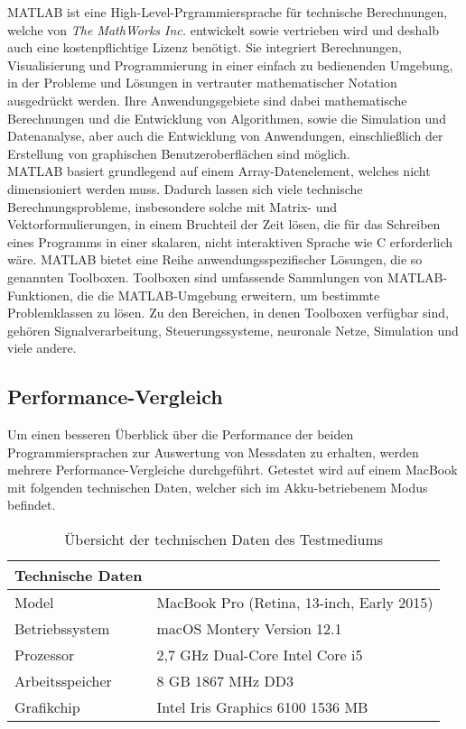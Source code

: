 MATLAB ist eine High-Level-Prgrammiersprache für technische Berechnungen, welche von \textit{The MathWorks Inc.} entwickelt sowie vertrieben wird und deshalb auch eine kostenpflichtige Lizenz benötigt. Sie integriert Berechnungen, Visualisierung und Programmierung in einer einfach zu bedienenden Umgebung, in der Probleme und Lösungen in vertrauter mathematischer Notation ausgedrückt werden. Ihre Anwendungsgebiete sind dabei mathematische Berechnungen und die Entwicklung von Algorithmen, sowie die Simulation und Datenanalyse, aber auch die Entwicklung von Anwendungen, einschließlich der Erstellung von graphischen Benutzeroberflächen sind möglich.\\
MATLAB basiert grundlegend auf einem Array-Datenelement, welches nicht dimensioniert werden muss. Dadurch lassen sich viele technische Berechnungsprobleme, insbesondere solche mit Matrix- und Vektorformulierungen, in einem Bruchteil der Zeit lösen, die für das Schreiben eines Programms in einer skalaren, nicht interaktiven Sprache wie C erforderlich wäre. MATLAB bietet eine Reihe anwendungsspezifischer Lösungen, die so genannten Toolboxen. Toolboxen sind umfassende Sammlungen von MATLAB-Funktionen, die die MATLAB-Umgebung erweitern, um bestimmte Problemklassen zu lösen. Zu den Bereichen, in denen Toolboxen verfügbar sind, gehören Signalverarbeitung, Steuerungssysteme, neuronale Netze, Simulation und viele andere.\cite{whatIsMatlab}\cite{whatIsMatlab2}

\subsection{Performance-Vergleich}

Um einen besseren Überblick über die Performance der beiden Programmiersprachen zur Auswertung von Messdaten zu erhalten, werden mehrere Performance-Vergleiche durchgeführt. Getestet wird auf einem MacBook mit folgenden technischen Daten, welcher sich im Akku-betriebenem Modus befindet. 

\begin{table}[H]
	\centering
	\begin{tabular}{|l|l|}
		\multicolumn{1}{l}{\textbf{Technische Daten}} & \multicolumn{1}{l}{}                       \\ 
		\hline
		Model                                         & MacBook Pro (Retina, 13-inch, Early 2015)  \\ 
		\hline
		Betriebssystem                                & macOS Montery Version 12.1                 \\ 
		\hline
		Prozessor                                     & 2,7 GHz Dual-Core Intel Core i5            \\ 
		\hline
		Arbeitsspeicher                               & 8 GB 1867 MHz DD3                          \\ 
		\hline
		Grafikchip                                    & Intel Iris Graphics 6100 1536 MB           \\
		\hline
	\end{tabular}
	\caption{Übersicht der technischen Daten des Testmediums}
\end{table}

